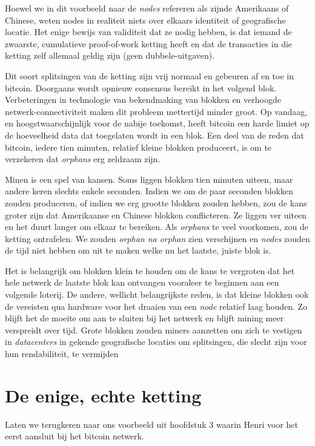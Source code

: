 Hoewel we in dit voorbeeld naar de \textit{nodes} refereren als zijnde Amerikaans of Chinese, weten nodes in realiteit niets over elkaars identiteit of geografische locatie. Het enige bewijs van validiteit dat ze nodig hebben, is dat iemand de zwaarste, cumulatieve proof-of-work ketting heeft en dat de transacties in die ketting zelf allemaal geldig zijn (geen dubbele-uitgaven).

Dit soort splitsingen van de ketting zijn vrij normaal en gebeuren af en toe in bitcoin. Doorgaans wordt opnieuw consensus bereikt in het volgend blok. Verbeteringen in technologie van bekendmaking van blokken en verhoogde netwerk-connectiviteit maken dit probleem mettertijd minder groot. Op vandaag, en hoogstwaarschijnlijk voor de nabije toekomst, heeft bitcoin een harde limiet op de hoeveelheid data dat toegelaten wordt in een blok. Een deel van de reden dat bitcoin, iedere tien minuten, relatief kleine blokken produceert, is om te verzekeren dat \textit{orphans} erg zeldzaam zijn.

Minen is een spel van kansen. Soms liggen blokken tien minuten uiteen, maar andere keren slechts enkele seconden. Indien we om de paar seconden blokken zouden produceren, of indien we erg grootte blokken zouden hebben, zou de kans groter zijn dat Amerikaanse en Chinese blokken conflicteren. Ze liggen ver uiteen en het duurt langer om elkaar te bereiken. Als \textit{orphans} te veel voorkomen, zou de ketting ontrafelen. We zouden \textit{orphan na orphan} zien verschijnen en \textit{nodes} zouden de tijd niet hebben om uit te maken welke nu het laatste, juiste blok is.

Het is belangrijk om blokken klein te houden om de kans te vergroten dat het hele netwerk de laatste blok kan ontvangen vooraleer te beginnen aan een volgende loterij. De andere, wellicht belangrijkste reden, is dat kleine blokken ook de vereisten qua hardware voor het draaien van een \textit{node} relatief laag houden. Zo blijft het de moeite om aan te sluiten bij het netwerk en blijft mining meer verspreidt over tijd. Grote blokken zouden miners aanzetten om zich te vestigen in \textit{datacenters} in gekende geografische locaties om splitsingen, die slecht zijn voor hun rendabiliteit, te vermijden

\section{De enige, echte ketting}
Laten we terugkeren naar ons voorbeeld uit hoofdstuk 3 waarin Henri voor het eerst aansluit bij het bitcoin netwerk.

